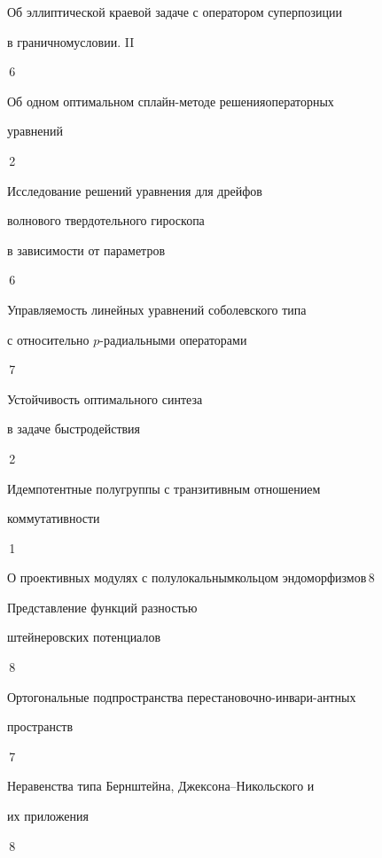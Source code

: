 

{Об эллиптической краевой задаче с оператором суперпозиции  


в граничном\newline условии. II}{\No\,6}




{Об одном оптимальном сплайн-методе решения\newline операторных


уравнений}{\No\,2}




{Исследование решений уравнения для дрейфов\newline


волнового твердотельного гироскопа


в зависимости от параметров}{\No\,6}




{Управляемость линейных уравнений соболевского типа\newline


с относительно $p$-радиальными операторами}{\No\,7}




{Устойчивость оптимального синтеза


в задаче быстродействия}{\No\,2}




{Идемпотентные полугруппы с транзитивным отношением


коммутативности}{\No\,1}




{О проективных модулях с полулокальным\newline кольцом эндоморфизмов}{\No\,8}




{Представление функций разностью


штейнеровских потенциалов}{\No\,8}




{Ортогональные подпространства перестановочно-инвари-\newline антных


пространств}{\No\,7}




{Неравенства типа Бернштейна, Джексона--Никольского и 


их приложения}{\No\,8}


